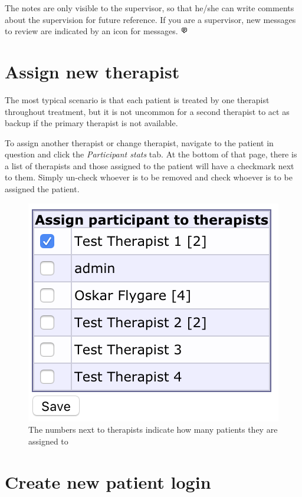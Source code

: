 \documentclass[]{book}
\begin{document}
The notes are only visible to the supervisor, so that he/she can write comments about the supervision for future reference. If you are a supervisor, new messages to review are indicated by an icon for messages. \includegraphics{images/supervision-message.png}

\hypertarget{assign-new-therapist}{%
\section{Assign new therapist}\label{assign-new-therapist}}

The most typical scenario is that each patient is treated by one therapist throughout treatment, but it is not uncommon for a second therapist to act as backup if the primary therapist is not available.

To assign another therapist or change therapist, navigate to the patient in question and click the \emph{Participant stats} tab. At the bottom of that page, there is a list of therapists and those assigned to the patient will have a checkmark next to them. Simply un-check whoever is to be removed and check whoever is to be assigned the patient.

\begin{figure}
\centering
\includegraphics{images/assign-therapist.png}
\caption{The numbers next to therapists indicate how many patients they are assigned to}
\end{figure}

\hypertarget{create-new-patient-login}{%
\section{Create new patient login}\label{create-new-patient-login}}
\end{document}
